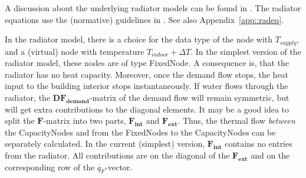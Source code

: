 A discussion about the underlying radiator models can be found in \cite{TolRadiator, TolThesis}. The radiator equations use the (normative) guidelines in \cite{NEN442}. See also Appendix~\ref{app::radeq}.

In the radiator model, there is a choice for the data type of the node with $T_{supply}$, and a (virtual) node with temperature $T_{indoor} + \Delta T$. In the simplest version of the radiator model, these nodes are of type \textsf{FixedNode}. A consequence is, that the radiator has no heat capacity. Moreover, once the demand flow stops, the heat input to the building interior stops instantaneously. If water flows through the radiator, the $\mathbf{DF_{demand}}$-matrix of the demand flow will remain symmetric, but will get extra contributions to the diagonal elements. It may be a good idea to split the $\mathbf{F}$-matrix into two parts, $\mathbf{F_{int}}$ and $\mathbf{F_{ext}}$. Thus, the thermal flow \emph{between} the \textsf{CapacityNodes} and from the \textsf{FixedNodes} to the \textsf{CapacityNodes} can be separately calculated. In the current (simplest) version, $\mathbf{F_{int}}$ contains no entries from the radiator. All contributions are on the diagonal of the $\mathbf{F_{ext}}$ and on the corresponding row of the $\dot{q_{F}}$-vector.

\newpage
